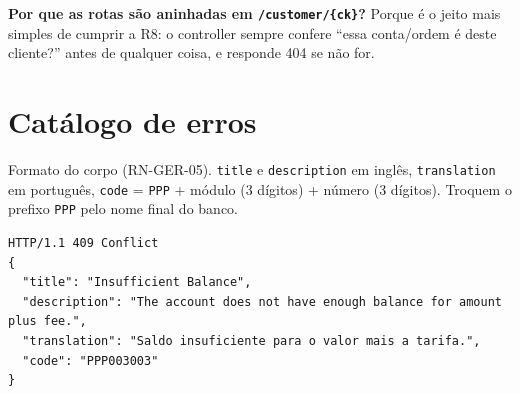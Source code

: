 \documentclass[11pt,a4paper]{article}
\newcommand{\tb}[1]{\texttt{#1}}           %
\begin{document}
\textbf{Por que as rotas são aninhadas em \tb{/customer/\{ck\}}?} Porque é o jeito mais simples de
cumprir a R8: o controller sempre confere ``essa conta/ordem é deste cliente?'' antes de qualquer
coisa, e responde 404 se não for.

\section{Catálogo de erros}\label{sec:erros}

Formato do corpo (RN-GER-05). \tb{title} e \tb{description} em inglês, \tb{translation} em
português, \tb{code} = \tb{PPP} + módulo (3 dígitos) + número (3 dígitos). Troquem o prefixo
\tb{PPP} pelo nome final do banco.

\begin{lstlisting}
HTTP/1.1 409 Conflict
{
  "title": "Insufficient Balance",
  "description": "The account does not have enough balance for amount plus fee.",
  "translation": "Saldo insuficiente para o valor mais a tarifa.",
  "code": "PPP003003"
}
\end{lstlisting}
\end{document}
